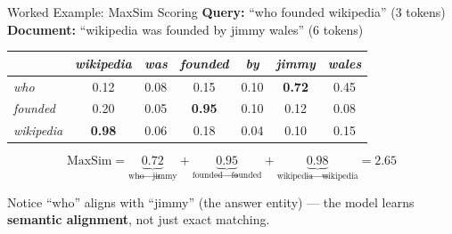 \documentclass[aspectratio=169]{beamer}
\newif\ifanimated
\newcommand{\cpause}{\ifanimated\pause\fi}
\begin{document}
\begin{frame}{Worked Example: MaxSim Scoring}
\textbf{Query:} ``who founded wikipedia'' (3 tokens)\\
\textbf{Document:} ``wikipedia was founded by jimmy wales'' (6 tokens)

\vspace{0.5em}

\begin{table}
\centering
\footnotesize
\begin{tabular}{lcccccc}
\toprule
& \textit{wikipedia} & \textit{was} & \textit{founded} & \textit{by} & \textit{jimmy} & \textit{wales} \\
\midrule
\textit{who}       & 0.12 & 0.08 & 0.15 & 0.10 & \textbf{0.72} & 0.45 \\
\textit{founded}   & 0.20 & 0.05 & \textbf{0.95} & 0.10 & 0.12 & 0.08 \\
\textit{wikipedia} & \textbf{0.98} & 0.06 & 0.18 & 0.04 & 0.10 & 0.15 \\
\bottomrule
\end{tabular}
\end{table}

\cpause
\vspace{0.5em}

$$\text{MaxSim} = \underbrace{0.72}_{\text{who}\to\text{jimmy}} + \underbrace{0.95}_{\text{founded}\to\text{founded}} + \underbrace{0.98}_{\text{wikipedia}\to\text{wikipedia}} = \mathbf{2.65}$$

\vspace{0.5em}

\begin{exampleblock}{Notice}
``who'' aligns with ``jimmy'' (the answer entity) --- the model learns \textbf{semantic alignment}, not just exact matching.
\end{exampleblock}
\end{frame}
\end{document}
